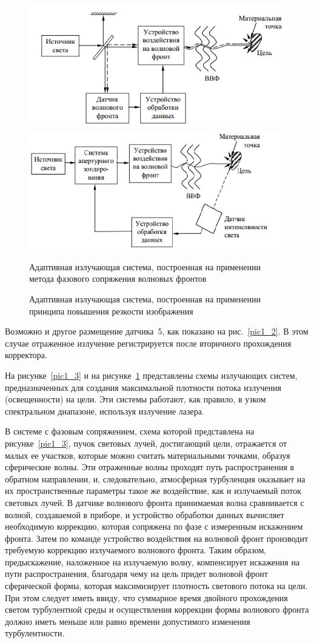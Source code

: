 \documentclass[pscyr]{hedwork}
\newcommand{\pic}[1]{\ref{pic#1}}
\begin{document}
\begin{figure}[ht]
  \center
  \includegraphics[width=.47\textwidth]{sl_1_3} \hfill
  \includegraphics[width=.47\textwidth]{sl_1_4} \\
  \parbox{.47\textwidth}{ \caption{Адаптивная излучающая система, построенная
    на применении метода фазового сопряжения волновых фронтов}
    \label{pic1_3} } \hfill
  \parbox{.47\textwidth}{ \caption{Адаптивная излучающая система, построенная
    на применении принципа повышения резкости изображения}
    \label{pic1_4} }
\end{figure}

Возможно и другое размещение датчика~5, как показано на рис.~\pic{1_2}. В
этом случае отраженное излучение регистрируется после вторичного прохождения
корректора.
 
На рисунке~\pic{1_3} и на рисунке~\pic{1_4} представлены схемы излучающих
систем, предназначенных для создания максимальной плотности потока излучения
(освещенности) на цели. Эти системы работают, как правило, в узком спектральном
диапазоне, используя излучение лазера.

В системе с фазовым сопряжением, схема которой представлена на
рисунке~\pic{1_3}, пучок световых лучей, достигающий цели, отражается от малых
ее участков, которые можно считать материальными точками, образуя сферические
волны. Эти отраженные волны проходят путь распространения в обратном
направлении, и, следовательно, атмосферная турбуленция оказывает на их
пространственные параметры такое же воздействие, как и излучаемый поток световых
лучей. В датчике волнового фронта принимаемая волна сравнивается с волной,
создаваемой в приборе, и устройство обработки данных вычисляет необходимую
коррекцию, которая сопряжена по фазе с измеренным искажением фронта. Затем по
команде устройство  воздействия  на волновой фронт производит требуемую
коррекцию излучаемого волнового фронта. Таким образом, предыскажение, наложенное
на излучаемую волну, компенсирует искажения на пути распространения, благодаря
чему на цель придет волновой фронт сферической формы, которая максимизирует
плотность светового потока на цели. При этом следует иметь ввиду, что суммарное
время двойного прохождения светом турбулентной среды и осуществления коррекции
формы волнового фронта должно иметь меньше или равно времени допустимого
изменения турбулентности.
\end{document}
